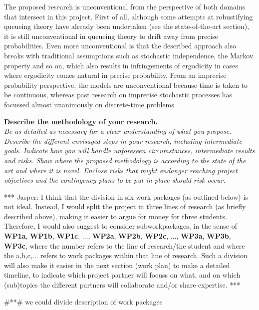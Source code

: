 \documentclass[11pt,dvipsnames,usenames,a4paper]{article}
\begin{document}
{The proposed research is unconventional from the perspective of both domains that intersect in this project.
First of all, although some attempts at robustifying queueing theory have already been undertaken (see the state-of-the-art section), it is still unconventional in queueing theory to drift away from precise probabilities. Even more unconventional is that the described approach also breaks with traditional assumptions such as stochastic independence, the Markov property and so on, which also results in infringements of ergodicity in cases where ergodicity comes natural in precise probability.
From an imprecise probability perspective, the models are unconventional because time is taken to be continuous, whereas past research on imprecise stochastic processes has focussed almost unanimously on discrete-time problems.
}

\vspace{7pt}

\textbf{Describe the methodology of your research.}\\
\textit{Be as detailed as necessary for a clear understanding of what you propose.
Describe the different envisaged steps in your research, including intermediate goals. Indicate how you will handle unforeseen circumstances, intermediate results and risks.
Show where the proposed methodology is according to the state of the art and where it is novel.
Enclose risks that might endanger reaching project objectives and the contingency plans to be put in place should risk occur.}

*** Jasper: I think that the division in six work packages (as outlined below) is not ideal. Instead, I would split the project in three lines of research (as briefly described above), making it easier to argue for money for three students. Therefore, I would also suggest to consider subworkpackages, in the sense of {\bf WP1a}, {\bf WP1b}, {\bf WP1c}, ..., {\bf WP2a}, {\bf WP2b}, {\bf WP2c}, ..., {\bf WP3a}, {\bf WP3b}, {\bf WP3c}, where the number refers to the line of research/the student and where the a,b,c,... refers to work packages within that line of research. Such a division will also make it easier in the next section (work plan) to make a detailed timeline, to indicate which project partner will focuss on what, and on which (sub)topics the different partners will collaborate and/or share expertise. ***


\#**\# we could divide description of work packages 
\end{document}
